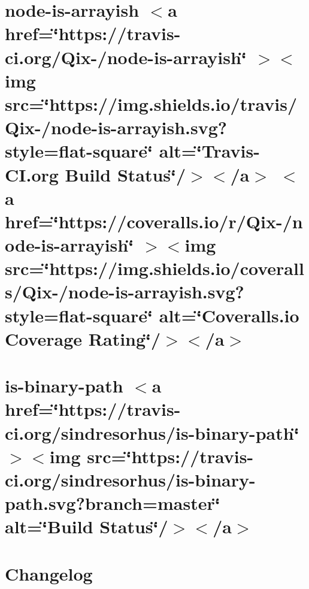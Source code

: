 \documentclass[twoside]{book}
\newcommand{\+}{\discretionary{\mbox{\scriptsize$\hookleftarrow$}}{}{}}
\begin{document}
\chapter{node-\/is-\/arrayish \texorpdfstring{$<$}{<}a href=\char`\"{}https\+://travis-\/ci.\+org/\+Qix-\//node-\/is-\/arrayish\char`\"{} \texorpdfstring{$>$}{>}\texorpdfstring{$<$}{<}img src=\char`\"{}https\+://img.\+shields.\+io/travis/\+Qix-\//node-\/is-\/arrayish.\+svg?style=flat-\/square\char`\"{} alt=\char`\"{}\+Travis-\/\+CI.\+org Build Status\char`\"{}/\texorpdfstring{$>$}{>}\texorpdfstring{$<$}{<}/a\texorpdfstring{$>$}{>} \texorpdfstring{$<$}{<}a href=\char`\"{}https\+://coveralls.\+io/r/\+Qix-\//node-\/is-\/arrayish\char`\"{} \texorpdfstring{$>$}{>}\texorpdfstring{$<$}{<}img src=\char`\"{}https\+://img.\+shields.\+io/coveralls/\+Qix-\//node-\/is-\/arrayish.\+svg?style=flat-\/square\char`\"{} alt=\char`\"{}\+Coveralls.\+io Coverage Rating\char`\"{}/\texorpdfstring{$>$}{>}\texorpdfstring{$<$}{<}/a\texorpdfstring{$>$}{>}}
\label{md__c___users_vaishnavi_jadhav__desktop__developer_code_mean_stack_example_client_node_modules_is_arrayish__r_e_a_d_m_e}

\chapter{is-\/binary-\/path \texorpdfstring{$<$}{<}a href=\char`\"{}https\+://travis-\/ci.\+org/sindresorhus/is-\/binary-\/path\char`\"{} \texorpdfstring{$>$}{>}\texorpdfstring{$<$}{<}img src=\char`\"{}https\+://travis-\/ci.\+org/sindresorhus/is-\/binary-\/path.\+svg?branch=master\char`\"{} alt=\char`\"{}\+Build Status\char`\"{}/\texorpdfstring{$>$}{>}\texorpdfstring{$<$}{<}/a\texorpdfstring{$>$}{>}}
\label{md__c___users_vaishnavi_jadhav__desktop__developer_code_mean_stack_example_client_node_modules_is_binary_path_readme}

\chapter{Changelog}
\label{md__c___users_vaishnavi_jadhav__desktop__developer_code_mean_stack_example_client_node_modules_ic8aad79fc921ba47e950fb4cfe2bac6f}

\end{document}
